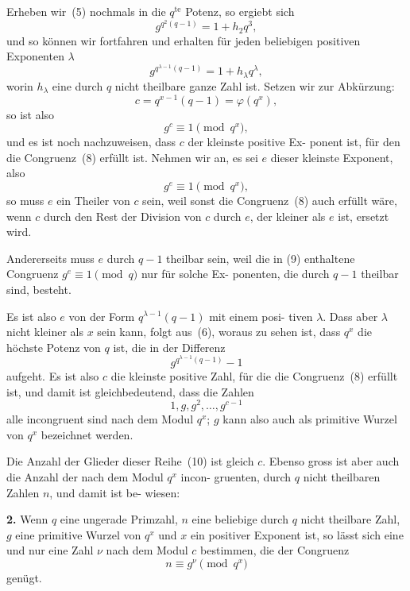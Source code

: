 \documentclass[12pt,a4paper]{article}
\theoremstyle{plain}
\theoremstyle{definition}
\theoremstyle{remark}
\begin{document}
Erheben wir~(5) nochmals in die $q^{\text{te}}$ Potenz, so ergiebt sich
\[
g^{q^2(q-1)} = 1 + h_2 q^3,
\]
und so können wir fortfahren und erhalten für jeden beliebigen
positiven Exponenten $\lambda$
\begin{equation}\tag{6}
g^{q^{\lambda-1}(q-1)} = 1 + h_\lambda q^\lambda,
\end{equation}
worin $h_\lambda$ eine durch $q$ nicht theilbare ganze Zahl ist. Setzen
wir zur Abkürzung:
\begin{equation}\tag{7}
c = q^{x-1}(q-1) = \varphi(q^x),
\end{equation}
so ist also
\begin{equation}\tag{8}
g^c \equiv 1 \pmod{q^x},
\end{equation}
und es ist noch nachzuweisen, dass $c$ der kleinste positive Ex-
ponent ist, für den die Congruenz~(8) erfüllt ist. Nehmen wir
an, es sei $e$ dieser kleinste Exponent, also
\begin{equation}\tag{9}
g^e \equiv 1 \pmod{q^x},
\end{equation}
so muss $e$ ein Theiler von $c$ sein, weil sonst die Congruenz~(8)
auch erfüllt wäre, wenn $c$ durch den Rest der Division von $c$
durch $e$, der kleiner als $e$ ist, ersetzt wird.

Andererseits muss $e$ durch $q-1$ theilbar sein, weil die in
(9) enthaltene Congruenz $g^e \equiv 1 \pmod{q}$ nur für solche Ex-
ponenten, die durch $q-1$ theilbar sind, besteht.

Es ist also $e$ von der Form $q^{\lambda-1}(q-1)$ mit einem posi-
tiven $\lambda$. Dass aber $\lambda$ nicht kleiner als $x$ sein kann, folgt aus~(6),
woraus zu sehen ist, dass $q^x$ die höchste Potenz von $q$ ist, die
in der Differenz
\[
g^{q^{\lambda-1}(q-1)} - 1
\]
aufgeht. Es ist also $c$ die kleinste positive Zahl, für die die
Congruenz~(8) erfüllt ist, und damit ist gleichbedeutend, dass
die Zahlen
\begin{equation}\tag{10}
1, g, g^2, \ldots, g^{c-1}
\end{equation}
alle incongruent sind nach dem Modul $q^x$; $g$ kann also auch als
primitive Wurzel von $q^x$ bezeichnet werden.

Die Anzahl der Glieder dieser Reihe~(10) ist gleich $c$. Ebenso
gross ist aber auch die Anzahl der nach dem Modul $q^x$ incon-
gruenten, durch $q$ nicht theilbaren Zahlen $n$, und damit ist be-
wiesen:

\textbf{2.} Wenn $q$ eine ungerade Primzahl, $n$ eine beliebige
durch $q$ nicht theilbare Zahl, $g$ eine primitive
Wurzel von $q^x$ und $x$ ein positiver Exponent ist,
so lässt sich eine und nur eine Zahl $\nu$ nach dem
Modul $c$ bestimmen, die der Congruenz
\[
n \equiv g^\nu \pmod{q^x}
\]
genügt.
\end{document}
